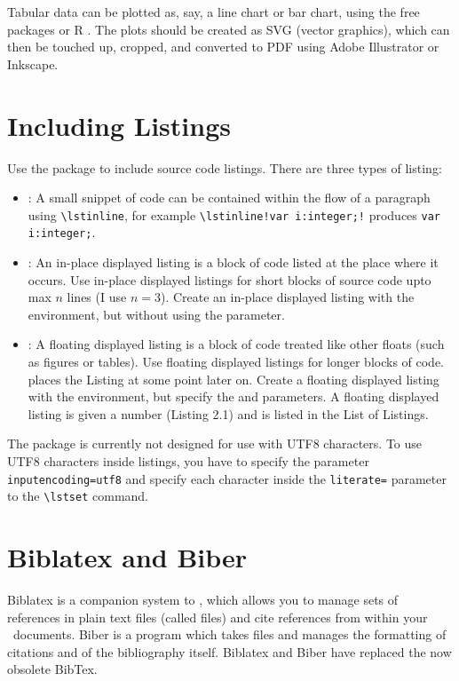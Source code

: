Tabular data can be plotted as, say, a line chart or bar chart, using
the free packages  \citep{gnuplot} or R \citep{R-Project}.
The plots should be created as SVG (vector graphics), which can then
be touched up, cropped, and converted to PDF using Adobe Illustrator
or Inkscape\citep{Inkscape}.





\section{Including Listings}

Use the  package to include source code listings.
There are three types of listing:
\begin{itemize}
\item {}: A small snippet of code can be contained
  within the flow of a paragraph using \lstinline!\lstinline!, for
  example \lstinline|\lstinline!var i:integer;!| produces
  \lstinline!var i:integer;!.

\item {}: An in-place displayed listing is a
  block of code listed at the place where it occurs. Use in-place
  displayed listings for short blocks of source code upto max $n$
  lines (I use $n=3$). Create an in-place displayed listing with the
   environment, but without using the 
  parameter.

\item {}: A floating displayed listing is a
  block of code treated like other \LaTeXe floats (such as figures or
  tables). Use floating displayed listings for longer blocks of code.
  \LaTeXe places the Listing at some point later on. Create a floating
  displayed listing with the  environment, but
  specify the  and  parameters. A floating
  displayed listing is given a number (Listing 2.1) and is listed in
  the List of Listings.

\end{itemize}

The  package is currently not designed for use with
UTF8 characters. To use UTF8 characters inside listings, you have to
specify the parameter \lstinline!inputencoding=utf8! and 
specify each character inside the \lstinline!literate=! parameter
to the \lstinline!\lstset! command.








\section{Biblatex and Biber}

Biblatex \citep{Biblatex} is a companion system to \LaTeXe, which
allows you to manage sets of references in plain text files (called
 files) and cite references from within your
\LaTeXe\ documents.  Biber \citep{Biber} is a program which takes
 files and manages the formatting of citations and of the
bibliography itself. Biblatex and Biber have replaced the now obsolete
BibTex.

